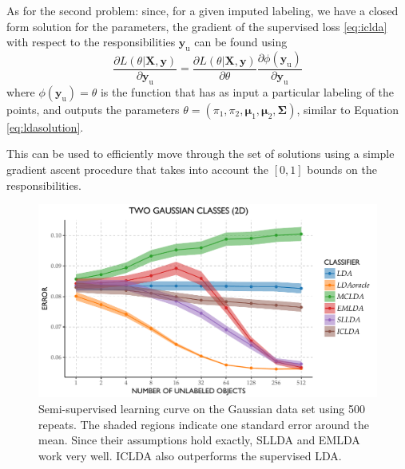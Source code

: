 \documentclass[twoside]{memoir}\usepackage[]{graphicx}\usepackage{xcolor}
\makeatletter
\def\maxwidth{ %
  \ifdim\Gin@nat@width>\linewidth
    \linewidth
  \else
    \Gin@nat@width
  \fi
}
\newenvironment{knitrout}{}{} %
\makeatother
\begin{document}
As for the second problem: since, for a given imputed labeling, we have a closed form solution for the parameters, the gradient of the supervised loss \eqref{eq:iclda} with respect to the responsibilities $\mathbf{y}_\textrm{u}$ can be found using
\begin{equation}
\frac{\partial L(\theta|\mathbf{X},\mathbf{y})}{\partial \mathbf{y}_\textrm{u}} = \frac{\partial L(\theta|\mathbf{X},\mathbf{y})}{\partial \theta} \frac{\partial \phi(\mathbf{y}_\textrm{u})}{\partial \mathbf{y}_\textrm{u}} 
\end{equation}
where $\phi(\mathbf{y}_\textrm{u})=\theta$ is the function that has as input a particular labeling of the points, and outputs the parameters $\theta=\left(\pi_1,\pi_2, \boldsymbol{\mu}_1,\boldsymbol{\mu}_2,\mathbf{\Sigma}\right)$, similar to Equation \eqref{eq:ldasolution}.

This can be used to efficiently move through the set of solutions using a simple gradient ascent procedure that takes into account the $[0,1]$ bounds on the responsibilities.

\begin{knitrout}
\color{fgcolor}\begin{figure}
\includegraphics[width=\maxwidth]{figure/learningcurvegauss-1} \caption[Semi-supervised learning curve on the Gaussian data set using 500 repeats]{Semi-supervised learning curve on the Gaussian data set using 500 repeats. The shaded regions indicate one standard error around the mean. Since their assumptions hold exactly, SLLDA and EMLDA work very well. ICLDA also outperforms the supervised LDA.}\label{fig:learningcurvegauss}
\end{figure}


\end{knitrout}
\end{document}
